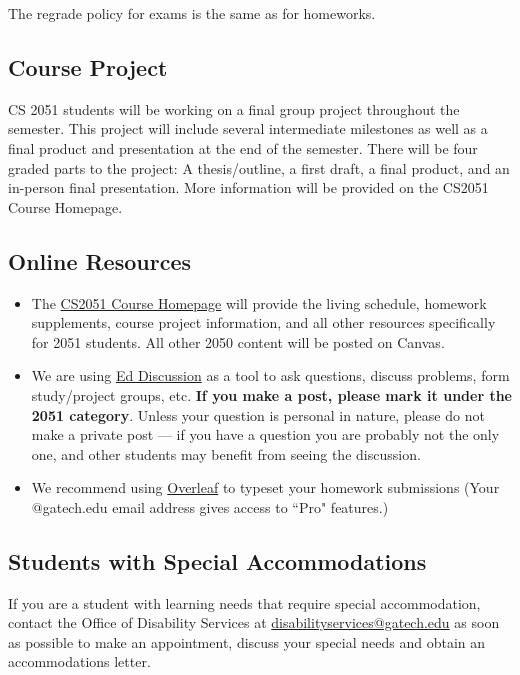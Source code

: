 \documentclass{article}
\begin{document}
    \vspace{3mm}
    The regrade policy for exams is the same as for homeworks.

\subsection*{Course Project}
    CS 2051 students will be working on a final group project throughout the semester. This project will include several intermediate milestones as well as a final product and presentation at the end of the semester. There will be four graded parts to the project: A thesis/outline, a first draft, a final product, and an in-person final presentation. More information will be provided on the CS2051 Course Homepage.

\subsection*{Online Resources}
    \begin{itemize}
        \item The \href{https://github.com/sar-mo/CS2051-HonorsDiscreteMath}{CS2051 Course Homepage} will provide the living schedule, homework supplements, course project information, and all other resources specifically for 2051 students. All other 2050 content will be posted on Canvas.
        \item We are using \href{https://edstem.org/}{Ed Discussion} as a tool to ask questions, discuss problems, form study/project groups, etc. \textbf{If you make a post, please mark it under the 2051 category}. Unless your question is personal in nature, please do not make a private post — if you have a question you are probably not the only one, and other students may benefit from seeing the discussion.
        \item We recommend using \href{https://overleaf.com}{Overleaf} to typeset your homework submissions (Your @gatech.edu email address gives access to ``Pro" features.)
    \end{itemize}

\subsection*{Students with Special Accommodations}
If you are a student with learning needs that require special accommodation, contact the Office of Disability Services at \url{disabilityservices@gatech.edu} as soon as possible to make an appointment, discuss your special needs and obtain an accommodations letter.
\end{document}
